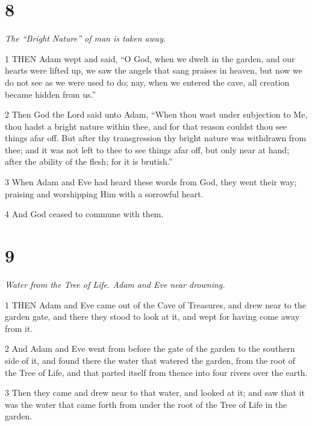 \chapter{8}

\par \textit{The “Bright Nature” of man is taken away.}

\par 1 THEN Adam wept and said, “O God, when we dwelt in the garden, and our hearts were lifted up, we saw the angels that sang praises in heaven, but now we do not see as we were used to do; nay, when we entered the cave, all creation became hidden from us.”

\par 2 Then God the Lord said unto Adam, “When thou wast under subjection to Me, thou hadst a bright nature within thee, and for that reason couldst thou see things afar off. But after thy transgression thy bright nature was withdrawn from thee; and it was not left to thee to see things afar off, but only near at hand; after the ability of the flesh; for it is brutish.”

\par 3 When Adam and Eve had heard these words from God, they went their way; praising and worshipping Him with a sorrowful heart.

\par 4 And God ceased to commune with them.

\chapter{9}

\par \textit{Water from the Tree of Life. Adam and Eve near drowning.}

\par 1 THEN Adam and Eve came out of the Cave of Treasures, and drew near to the garden gate, and there they stood to look at it, and wept for having come away from it.

\par 2 And Adam and Eve went from before the gate of the garden to the southern side of it, and found there the water that watered the garden, from the root of the Tree of Life, and that parted itself from thence into four rivers over the earth.

\par 3 Then they came and drew near to that water, and looked at it; and saw that it was the water that came forth from under the root of the Tree of Life in the garden.

